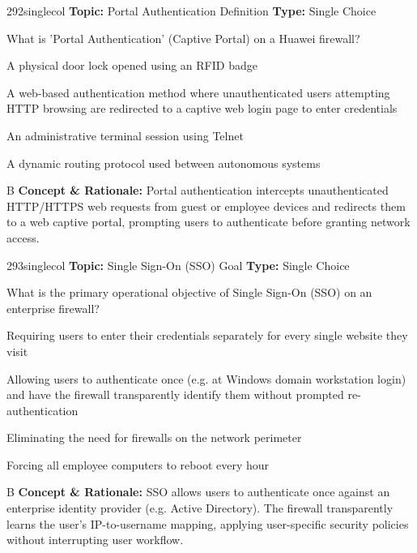 \begin{qcard}{292}{singlecol}
\textcolor{darkslate!75}{\small\textbf{Topic:} Portal Authentication Definition \hfill \textbf{Type:} Single Choice}\vspace{0.4em}\par
What is 'Portal Authentication' (Captive Portal) on a Huawei firewall?
\begin{qoptions}
\item A physical door lock opened using an RFID badge
\item A web-based authentication method where unauthenticated users attempting HTTP browsing are redirected to a captive web login page to enter credentials
\item An administrative terminal session using Telnet
\item A dynamic routing protocol used between autonomous systems
\end{qoptions}
\end{qcard}
\nopagebreak
\begin{explainbox}{B}
\textbf{Concept \& Rationale:} Portal authentication intercepts unauthenticated HTTP/HTTPS web requests from guest or employee devices and redirects them to a web captive portal, prompting users to authenticate before granting network access.
\end{explainbox}

\begin{qcard}{293}{singlecol}
\textcolor{darkslate!75}{\small\textbf{Topic:} Single Sign-On (SSO) Goal \hfill \textbf{Type:} Single Choice}\vspace{0.4em}\par
What is the primary operational objective of Single Sign-On (SSO) on an enterprise firewall?
\begin{qoptions}
\item Requiring users to enter their credentials separately for every single website they visit
\item Allowing users to authenticate once (e.g. at Windows domain workstation login) and have the firewall transparently identify them without prompted re-authentication
\item Eliminating the need for firewalls on the network perimeter
\item Forcing all employee computers to reboot every hour
\end{qoptions}
\end{qcard}
\nopagebreak
\begin{explainbox}{B}
\textbf{Concept \& Rationale:} SSO allows users to authenticate once against an enterprise identity provider (e.g. Active Directory). The firewall transparently learns the user's IP-to-username mapping, applying user-specific security policies without interrupting user workflow.
\end{explainbox}

